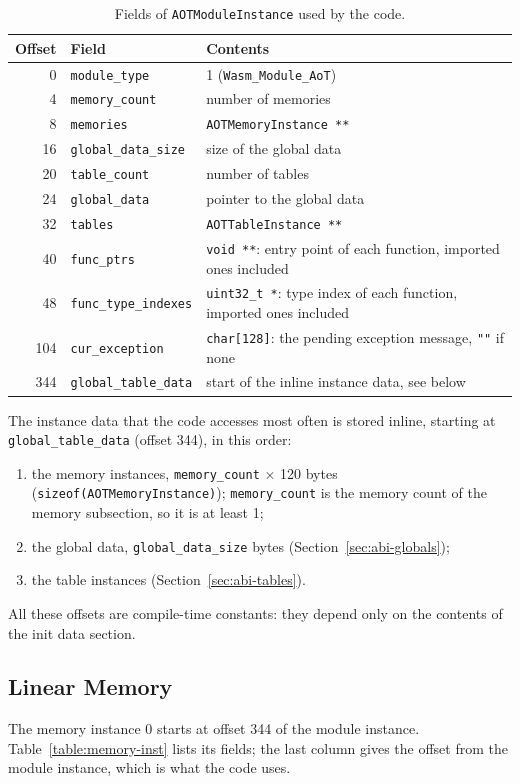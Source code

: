 \documentclass{article}
\begin{document}
\begin{table}[H]
\centering
\begin{tabular}{rll}
    \hline
    Offset & Field & Contents \\
    \hline
    0   & \verb|module_type| & 1 (\verb|Wasm_Module_AoT|) \\
    4   & \verb|memory_count| & number of memories \\
    8   & \verb|memories| & \verb|AOTMemoryInstance **| \\
    16  & \verb|global_data_size| & size of the global data \\
    20  & \verb|table_count| & number of tables \\
    24  & \verb|global_data| & pointer to the global data \\
    32  & \verb|tables| & \verb|AOTTableInstance **| \\
    40  & \verb|func_ptrs| & \verb|void **|: entry point of each function, imported ones included \\
    48  & \verb|func_type_indexes| & \verb|uint32_t *|: type index of each function, imported ones included \\
    104 & \verb|cur_exception| & \verb|char[128]|: the pending exception message, \verb|""| if none \\
    344 & \verb|global_table_data| & start of the inline instance data, see below \\
    \hline
\end{tabular}
\caption{Fields of \texttt{AOTModuleInstance} used by the code.}
\label{table:module-inst}
\end{table}

The instance data that the code accesses most often is stored inline, starting at \verb|global_table_data| (offset 344), in this order:
\begin{enumerate}
    \item the memory instances, \verb|memory_count| $\times$ 120 bytes (\verb|sizeof(AOTMemoryInstance)|); \verb|memory_count| is the memory count of the memory subsection, so it is at least 1;
    \item the global data, \verb|global_data_size| bytes (Section~\ref{sec:abi-globals});
    \item the table instances (Section~\ref{sec:abi-tables}).
\end{enumerate}
All these offsets are compile-time constants: they depend only on the contents of the init data section.

\subsection{Linear Memory}
\label{sec:abi-memory}
The memory instance 0 starts at offset 344 of the module instance.
Table~\ref{table:memory-inst} lists its fields; the last column gives the offset from the module instance, which is what the code uses.
\end{document}
